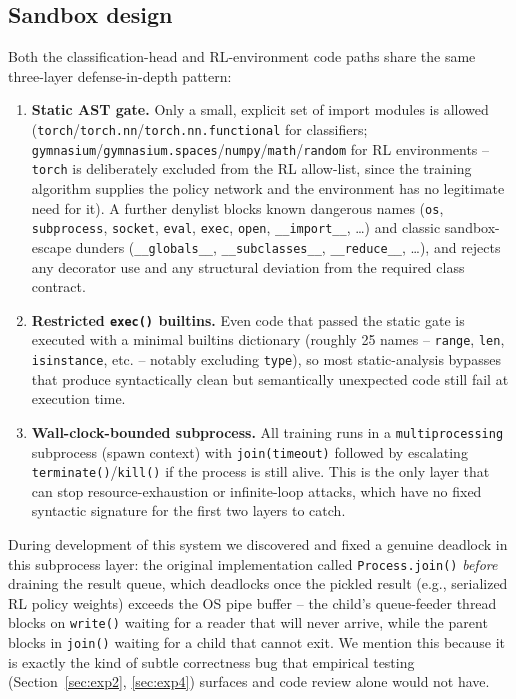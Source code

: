 \documentclass[10pt,twocolumn]{article}
\begin{document}
\subsection{Sandbox design}
\label{sec:sandbox-design}
Both the classification-head and RL-environment code paths share the same
three-layer defense-in-depth pattern:
\begin{enumerate}
  \item \textbf{Static AST gate.} Only a small, explicit set of import
        modules is allowed (\texttt{torch}/\texttt{torch.nn}/\texttt{torch.nn.functional}
        for classifiers; \texttt{gymnasium}/\texttt{gymnasium.spaces}/\texttt{numpy}/\texttt{math}/\texttt{random}
        for RL environments -- \texttt{torch} is deliberately excluded from
        the RL allow-list, since the training algorithm supplies the policy
        network and the environment has no legitimate need for it). A
        further denylist blocks known dangerous names (\texttt{os},
        \texttt{subprocess}, \texttt{socket}, \texttt{eval}, \texttt{exec},
        \texttt{open}, \texttt{\_\_import\_\_}, \ldots) and classic sandbox-escape
        dunders (\texttt{\_\_globals\_\_}, \texttt{\_\_subclasses\_\_},
        \texttt{\_\_reduce\_\_}, \ldots), and rejects any decorator use and
        any structural deviation from the required class contract.
  \item \textbf{Restricted \texttt{exec()} builtins.} Even code that passed
        the static gate is executed with a minimal builtins dictionary
        (roughly 25 names -- \texttt{range}, \texttt{len}, \texttt{isinstance},
        etc. -- notably excluding \texttt{type}), so most static-analysis
        bypasses that produce syntactically clean but semantically
        unexpected code still fail at execution time.
  \item \textbf{Wall-clock-bounded subprocess.} All training runs in a
        \texttt{multiprocessing} subprocess (spawn context) with
        \texttt{join(timeout)} followed by escalating
        \texttt{terminate()}/\texttt{kill()} if the process is still alive.
        This is the only layer that can stop resource-exhaustion or
        infinite-loop attacks, which have no fixed syntactic signature for
        the first two layers to catch.
\end{enumerate}
During development of this system we discovered and fixed a genuine
deadlock in this subprocess layer: the original implementation called
\texttt{Process.join()} \emph{before} draining the result queue, which
deadlocks once the pickled result (e.g., serialized RL policy weights)
exceeds the OS pipe buffer -- the child's queue-feeder thread blocks on
\texttt{write()} waiting for a reader that will never arrive, while the
parent blocks in \texttt{join()} waiting for a child that cannot exit. We
mention this because it is exactly the kind of subtle correctness bug that
empirical testing (Section~\ref{sec:exp2}, \ref{sec:exp4}) surfaces and
code review alone would not have.
\end{document}
